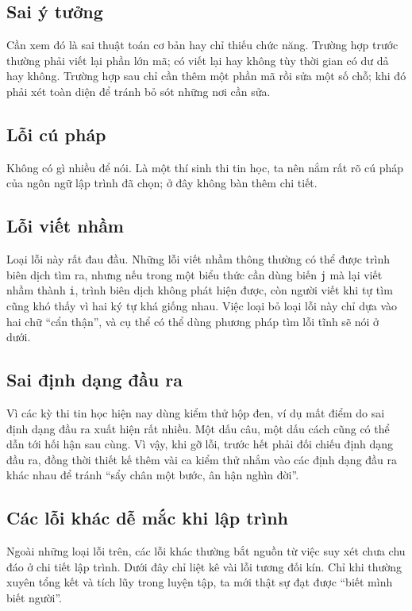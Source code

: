 \documentclass[11pt]{article}
\begin{document}
\subsection{Sai ý tưởng}

Cần xem đó là sai thuật toán cơ bản hay chỉ thiếu chức năng. Trường hợp trước
thường phải viết lại phần lớn mã; có viết lại hay không tùy thời gian có dư
dả hay không. Trường hợp sau chỉ cần thêm một phần mã rồi sửa một số chỗ; khi
đó phải xét toàn diện để tránh bỏ sót những nơi cần sửa.

\subsection{Lỗi cú pháp}

Không có gì nhiều để nói. Là một thí sinh thi tin học, ta nên nắm rất rõ cú
pháp của ngôn ngữ lập trình đã chọn; ở đây không bàn thêm chi tiết.

\subsection{Lỗi viết nhầm}

Loại lỗi này rất đau đầu. Những lỗi viết nhầm thông thường có thể được trình
biên dịch tìm ra, nhưng nếu trong một biểu thức cần dùng biến \texttt{j} mà
lại viết nhầm thành \texttt{i}, trình biên dịch không phát hiện được, còn
người viết khi tự tìm cũng khó thấy vì hai ký tự khá giống nhau. Việc loại bỏ
loại lỗi này chỉ dựa vào hai chữ ``cẩn thận'', và cụ thể có thể dùng phương
pháp tìm lỗi tĩnh sẽ nói ở dưới.

\subsection{Sai định dạng đầu ra}

Vì các kỳ thi tin học hiện nay dùng kiểm thử hộp đen, ví dụ mất điểm do sai
định dạng đầu ra xuất hiện rất nhiều. Một dấu câu, một dấu cách cũng có thể
dẫn tới hối hận sau cùng. Vì vậy, khi gỡ lỗi, trước hết phải đối chiếu định
dạng đầu ra, đồng thời thiết kế thêm vài ca kiểm thử nhắm vào các định dạng
đầu ra khác nhau để tránh ``sẩy chân một bước, ân hận nghìn đời''.

\subsection{Các lỗi khác dễ mắc khi lập trình}

Ngoài những loại lỗi trên, các lỗi khác thường bắt nguồn từ việc suy xét chưa
chu đáo ở chi tiết lập trình. Dưới đây chỉ liệt kê vài lỗi tương đối kín. Chỉ
khi thường xuyên tổng kết và tích lũy trong luyện tập, ta mới thật sự đạt
được ``biết mình biết người''.
\end{document}
